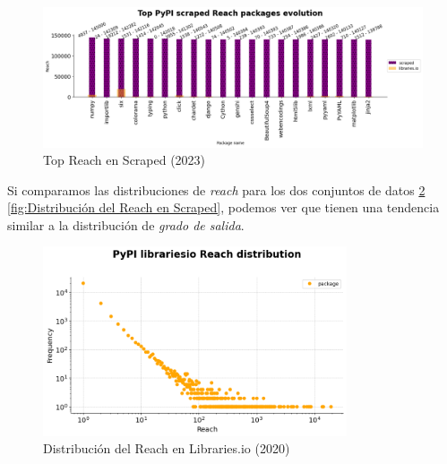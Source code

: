 \begin{figure}[ht!]
    \begin{center}
        \includegraphics[width=1\textwidth]{img/pypi/top_scraped_reach_evolution.png}
        \caption{Top Reach en Scraped (2023)}
    \end{center}
    \label{fig:Top Reach en Scraped}
\end{figure}


Si comparamos las distribuciones de \textit{reach} para los dos conjuntos de datos
\ref{fig:Distribución del Reach en Libraries.io} \ref{fig:Distribución del Reach en Scraped},
podemos ver que tienen una tendencia similar a la distribución de \textit{grado de salida}.

\begin{figure}[ht!]
    \begin{center}
        \includegraphics[width=0.8\textwidth]{img/pypi/librariesio_reach_distribution.png}
        \caption{Distribución del Reach en Libraries.io (2020)}
    \end{center}
    \label{fig:Distribución del Reach en Libraries.io}
\end{figure}

